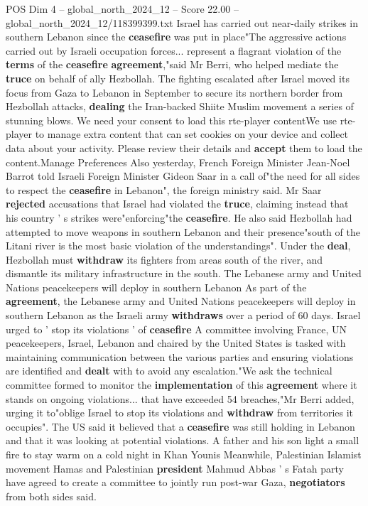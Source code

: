 \begin{textsample}{POS Dim 4 – global\_north\_2024\_12 – Score 22.00 – global\_north\_2024\_12/118399399.txt}
Israel has carried out near-daily strikes in southern Lebanon since the \textbf{ceasefire} was put in place"The aggressive actions carried out by Israeli occupation forces... represent a flagrant violation of the \textbf{terms} of the \textbf{ceasefire} \textbf{agreement},"said Mr Berri, who helped mediate the \textbf{truce} on behalf of ally Hezbollah.
The fighting escalated after Israel moved its focus from Gaza to Lebanon in September to secure its northern border from Hezbollah attacks, \textbf{dealing} the Iran-backed Shiite Muslim movement a series of stunning blows.
We need your consent to load this rte-player contentWe use rte-player to manage extra content that can set cookies on your device and collect data about your activity.
Please review their details and \textbf{accept} them to load the content.Manage Preferences Also yesterday, French Foreign Minister Jean-Noel Barrot told Israeli Foreign Minister Gideon Saar in a call of"the need for all sides to respect the \textbf{ceasefire} in Lebanon", the foreign ministry said.
Mr Saar \textbf{rejected} accusations that Israel had violated the \textbf{truce}, claiming instead that his country ' s strikes were"enforcing"the \textbf{ceasefire}.
He also said Hezbollah had attempted to move weapons in southern Lebanon and their presence"south of the Litani river is the most basic violation of the understandings".
Under the \textbf{deal}, Hezbollah must \textbf{withdraw} its fighters from areas south of the river, and dismantle its military infrastructure in the south.
The Lebanese army and United Nations peacekeepers will deploy in southern Lebanon As part of the \textbf{agreement}, the Lebanese army and United Nations peacekeepers will deploy in southern Lebanon as the Israeli army \textbf{withdraws} over a period of 60 days.
Israel urged to ' stop its violations ' of \textbf{ceasefire} A committee involving France, UN peacekeepers, Israel, Lebanon and chaired by the United States is tasked with maintaining communication between the various parties and ensuring violations are identified and \textbf{dealt} with to avoid any escalation."We ask the technical committee formed to monitor the \textbf{implementation} of this \textbf{agreement} where it stands on ongoing violations... that have exceeded 54 breaches,"Mr Berri added, urging it to"oblige Israel to stop its violations and \textbf{withdraw} from territories it occupies".
The US said it believed that a \textbf{ceasefire} was still holding in Lebanon and that it was looking at potential violations.
A father and his son light a small fire to stay warm on a cold night in Khan Younis Meanwhile, Palestinian Islamist movement Hamas and Palestinian \textbf{president} Mahmud Abbas ' s Fatah party have agreed to create a committee to jointly run post-war Gaza, \textbf{negotiators} from both sides said.

\end{textsample}
